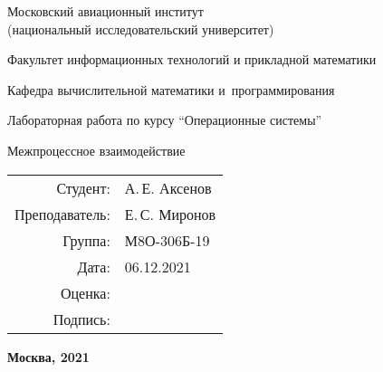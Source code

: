 \begin{titlepage}
\begin{center}
\bfseries

{\Large Московский авиационный институт\\ (национальный исследовательский университет)}

\vspace{48pt}

{\large Факультет информационных технологий и прикладной математики
}

{\large Кафедра вычислительной математики и~программирования}


\vspace{48pt}

Лабораторная работа  по курсу \enquote{Операционные системы}

\vspace{24pt}

{\Large Межпроцессное взаимодействие}

\end{center}

\vspace{72pt}

\begin{flushright}
\begin{tabular}{rl}
Студент: & А.\,Е. Аксенов \\
Преподаватель: & Е.\,С. Миронов  \\
Группа: & М8О-306Б-19 \\
Дата: & 06.12.2021 \\
Оценка: & \\
Подпись: & \\
\end{tabular}
\end{flushright}

\vfill

\begin{center}
\bfseries
Москва, 2021
\end{center}
\end{titlepage}

\pagebreak
